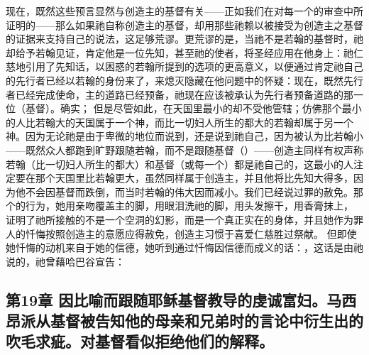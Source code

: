 现在，既然这些预言显然与创造主的基督有关——正如我们在对每一个的审查中所证明的——那么如果祂自称创造主的基督，却用那些祂赖以被接受为创造主之基督的证据来支持自己的说法，这足够荒谬。更荒谬的是，当祂不是若翰的基督时，祂却给予若翰见证，肯定他是一位先知，甚至祂的使者，将圣经应用在他身上：祂仁慈地引用了先知话，以困惑的若翰所提到的选项的更高意义，以便通过肯定祂自己的先行者已经以若翰的身份来了，来熄灭隐藏在他问题中的怀疑：现在，既然先行者已经完成使命，主的道路已经预备，祂现在应该被承认为先行者预备道路的那一位（基督）。确实； 但是尽管如此，在天国里最小的却不受他管辖；仿佛那个最小的人比若翰大的天国属于一个神，而比一切妇人所生的都大的若翰却属于另一个神。因为无论祂是由于卑微的地位而说到，还是说到祂自己，因为被认为比若翰小——既然众人都跑到旷野跟随若翰，而不是跟随基督（）——创造主同样有权声称若翰（比一切妇人所生的都大）和基督（或每一个）都是祂自己的，这最小的人注定要在那个天国里比若翰更大，虽然同样属于创造主，并且他将比先知大得多，因为他不会因基督而跌倒，而当时若翰的伟大因而减小。我们已经说过罪的赦免。那个的行为，她用亲吻覆盖主的脚，用眼泪洗祂的脚，用头发擦干，用香膏抹上， 证明了祂所接触的不是一个空洞的幻影，而是一个真正实在的身体，并且她作为罪人的忏悔按照创造主的意愿应得赦免，创造主习惯于喜爱仁慈胜过祭献。 但即使她忏悔的动机来自于她的信德，她听到通过忏悔因信德而成义的话：，这话是由祂说的，祂曾藉哈巴谷宣告：\par


\subsection{第19章 因比喻而跟随耶稣基督教导的虔诚富妇。马西昂派从基督被告知他的母亲和兄弟时的言论中衍生出的吹毛求疵。对基督看似拒绝他们的解释。}

